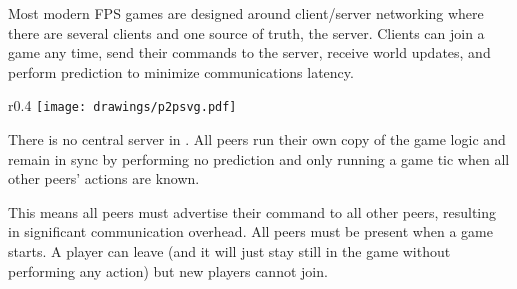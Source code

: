 Most modern FPS games are designed around client/server networking where there are several clients and one source of truth, the server. Clients can join a game any time, send their commands to the server, receive world updates, and perform prediction to minimize communications latency.\\
\par
\begin{wrapfigure}[12]{r}{0.4\textwidth}
\centering
\texttt{[image: drawings/p2psvg.pdf]}
\end{wrapfigure}
There is no central server in \doom. All peers run their own copy of the game logic and remain in sync by performing no prediction and only running a game tic when all other peers' actions are known.\\
\par
 This means all peers must advertise their command to all other peers, resulting in significant communication overhead. 
All peers must be present when a game starts. A player can leave (and it will just stay still in the game without performing any action) but new players cannot join.
\pagebreak





